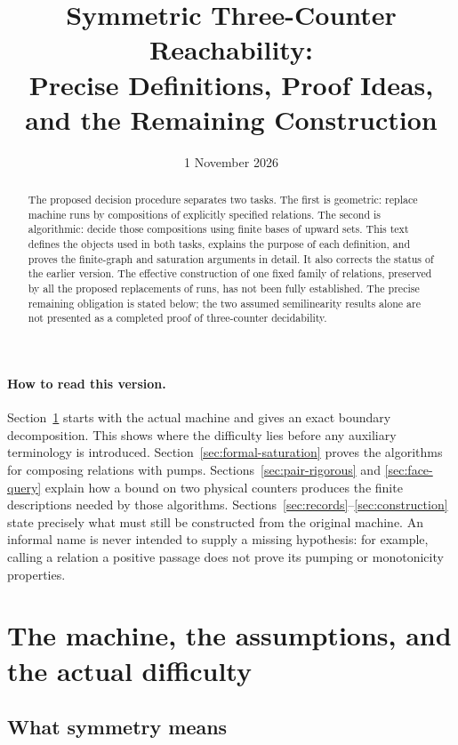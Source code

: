 \documentclass[11pt,a4paper]{article}
\title{Symmetric Three-Counter Reachability:\\
Precise Definitions, Proof Ideas, and the Remaining Construction}
\author{}
\date{1 November 2026}
\theoremstyle{definition}
\theoremstyle{remark}
\begin{document}
\maketitle

\begin{abstract}
The proposed decision procedure separates two tasks. The first is
geometric: replace machine runs by compositions of explicitly specified
relations. The second is algorithmic: decide those compositions using
finite bases of upward sets. This text defines the objects used in both
tasks, explains the purpose of each definition, and proves the
finite-graph and saturation arguments in detail.
It also corrects the status of the earlier version. The effective
construction of one fixed family of relations, preserved by all the
proposed replacements of runs, has not been fully established.
The precise remaining obligation is stated below; the two assumed
semilinearity results alone are not presented as a completed proof of
three-counter decidability.
\end{abstract}

\paragraph{How to read this version.}
Section~\ref{sec:model} starts with the actual machine and gives an exact
boundary decomposition. This shows where the difficulty lies before any
auxiliary terminology is introduced.
Section~\ref{sec:formal-saturation} proves the algorithms for composing
relations with pumps.
Sections~\ref{sec:pair-rigorous} and \ref{sec:face-query} explain how a
bound on two physical counters produces the finite descriptions needed
by those algorithms.
Sections~\ref{sec:records}--\ref{sec:construction} state precisely what
must still be constructed from the original machine.
An informal name is never intended to supply a missing hypothesis:
for example, calling a relation a positive passage does not prove
its pumping or monotonicity properties.

\tableofcontents
\bigskip

\section{The machine, the assumptions, and the actual difficulty}
\label{sec:model}

\subsection{What symmetry means}
\end{document}

